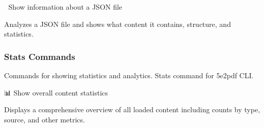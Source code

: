 \documentclass[letterpaper,10pt,english]{sphinxmanual}
\begin{document}

\begin{fulllineitems}
\label{\detokenize{api/cli:src.cli.commands.info.show_file_info}}
\pysigstartsignatures
\pysiglinewithargsret
{}
{}
{}
\pysigstopsignatures
\sphinxAtStartPar
📄 Show information about a JSON file

\sphinxAtStartPar
Analyzes a JSON file and shows what content it contains,
structure, and statistics.

\end{fulllineitems}



\subsubsection{Stats Commands}
\label{\detokenize{api/cli:stats-commands}}
\sphinxAtStartPar
Commands for showing statistics and analytics.
\label{\detokenize{api/cli:module-src.cli.commands.stats}}
\sphinxAtStartPar
Stats command for 5e2pdf CLI.

\begin{fulllineitems}
\label{\detokenize{api/cli:src.cli.commands.stats.show_overview}}
\pysigstartsignatures
\pysiglinewithargsret
{}
{}
{}
\pysigstopsignatures
\sphinxAtStartPar
📊 Show overall content statistics

\sphinxAtStartPar
Displays a comprehensive overview of all loaded content including
counts by type, source, and other metrics.

\end{fulllineitems}

\end{document}

